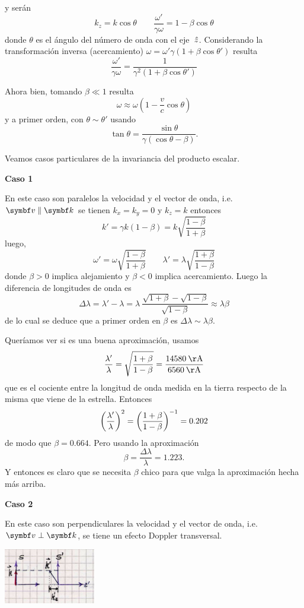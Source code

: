 \documentclass[10pt,oneside]{CBFT_book}
\begin{document}
y serán
\[
	k_z = k \cos\theta \qquad 
	\frac{\omega'}{\gamma \omega} = 1 - \beta \cos \theta
\]
donde $\theta$ es el ángulo del número de onda con el eje $\:\hat{z}$.
Considerando la transformación inversa (acercamiento)
$ \omega  = \omega' \gamma \left( 1 + \beta \cos\theta' \right) $ resulta
\[
	\frac{\omega'}{\gamma \omega} = \frac{ 1 }{ \gamma^2( 1 + \beta \cos \theta' ) }
\]

Ahora bien, tomando $\beta \ll 1 $ resulta
\[
	\omega \approx \omega \left( 1 - \frac{v}{c} \cos\theta \right)
\]
y a primer orden, con $\theta \sim \theta'$ usando 
\[
	\tan\theta = \frac{\sin\theta}{\gamma(\cos\theta -\beta)}.
\]

Veamos casos particulares de la invariancia del producto escalar.

{\bf Caso 1}

En este caso son paralelos la velocidad y el vector de onda, i.e. $\vb{v} \parallel \vb{k}$
se tienen $k_x=k_y=0$ y $k_z=k$ entonces
\[
	k' =  \gamma k (1 - \beta) = k \sqrt{ \frac{1-\beta}{1+\beta} }
\]
luego,
\[
	\omega' = \omega \sqrt{ \frac{1-\beta}{1+\beta} } \qquad 
	\lambda' = \lambda \sqrt{ \frac{1+\beta}{1-\beta} }
\]
donde $\beta > 0 $ implica alejamiento y $\beta < 0 $ implica acercamiento.
Luego la diferencia de longitudes de onda es
\[
	\Delta \lambda = \lambda' - \lambda = 
	\lambda \: \frac{ \sqrt{1+\beta} - \sqrt{1-\beta} }{ \sqrt{1-\beta} } 
	\approx \lambda \beta
\]
de lo cual se deduce que a primer orden en $\beta$ es $\Delta\lambda \sim \lambda\beta$.

Queríamos ver si es una buena aproximación, usamos
\[
	\frac{\lambda'}{\lambda} = \sqrt{\frac{1+\beta}{1-\beta}} = 
	\frac{ 14580 \:\mathrm{ \AA} }{ 6560 \:\mathrm{ \AA}}
\]
que es el cociente entre la longitud de onda medida en la tierra respecto de la misma
que viene de la estrella.
Entonces
\[
	\left( \frac{ \lambda' }{ \lambda } \right)^2 = \left( \frac{ 1+\beta }{ 1-\beta } \right)^{-1} = 0.202
\]
de modo que $\beta = 0.664$. Pero usando la aproximación
\[
	\beta = \frac{\Delta \lambda}{\lambda} = 1.223.
\]
Y entonces es claro que se necesita $\beta$ chico para que valga la aproximación hecha
más arriba.

{\bf Caso 2}

En este caso son perpendiculares la velocidad y el vector de onda, i.e. $\vb{v} \perp \vb{k}$,
se tiene un efecto Doppler transversal.

\includegraphics[width=0.3\textwidth]{images/fig_ft1_sperel_doppler2.jpg}
\end{document}
